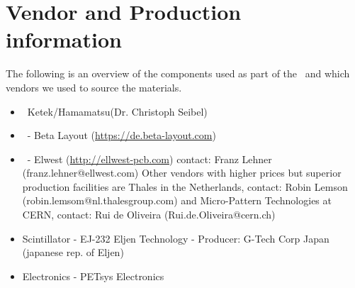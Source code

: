 \documentclass[../BTOF_summary.tex]{subfiles}
\begin{document}
\section{Vendor and Production information}

The following is an overview of the components used as part of the \btofD\ and which vendors we used to source the materials.

\begin{itemize}
    \item \sipms\ Ketek/Hamamatsu(Dr. Christoph Seibel)
    \item \sensorboard\ - Beta Layout (\url{https://de.beta-layout.com})
    \item \railboard\ - Elwest (\url{http://ellwest-pcb.com}) contact: Franz Lehner (franz.lehner@ellwest.com)
    Other vendors with higher prices but superior production facilities are Thales in the Netherlands, contact: Robin Lemson (robin.lemsom@nl.thalesgroup.com) and Micro-Pattern Technologies at CERN, contact: Rui de Oliveira (Rui.de.Oliveira@cern.ch)
    \item Scintillator - EJ-232 Eljen Technology - Producer: G-Tech Corp Japan (japanese rep. of Eljen)
    \item Electronics - PETsys Electronics
\end{itemize}
\end{document}
